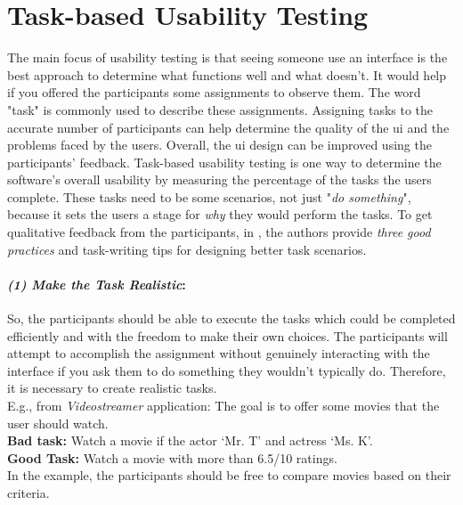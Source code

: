 \clearpage
\section{Task-based Usability Testing}
\label{background:section:task}
The main focus of usability testing is that seeing someone use an interface is the best approach to determine what functions well and what doesn't. 
It would help if you offered the participants some assignments to observe them. 
The word "task" is commonly used to describe these assignments.
Assigning tasks to the accurate number of participants can help determine the quality of the \ac{ui} and the problems faced by the users. 
Overall, the \ac{ui} design can be improved using the participants' feedback. 
Task-based usability testing is one way to determine the software's overall usability \cite{article:usability:doesburg} by measuring the percentage of the tasks the users complete.
These tasks need to be some scenarios, not just "\textit{do something}", because it sets the users a stage for \textit{why} they would perform the tasks. 
To get qualitative feedback from the participants, in \cite{misc:usability:tasks}, the authors provide \textit{three good practices} and task-writing tips for designing better task scenarios.

\paragraph{\textit{(1) Make the Task Realistic}:}
So, the participants should be able to execute the tasks which could be completed efficiently and with the freedom to make their own choices.
The participants will attempt to accomplish the assignment without genuinely interacting with the interface if you ask them to do something they wouldn't typically do. 
Therefore, it is necessary to create realistic tasks. \\
E.g., from \textit{Videostreamer} application: The goal is to offer some movies that the user should watch. \\
\textbf{Bad task: } Watch a movie if the actor `Mr. T' and actress `Ms. K'. \\
\textbf{Good Task: } Watch a movie with more than 6.5/10 ratings. \\
In the example, the participants should be free to compare movies based on their criteria. 

